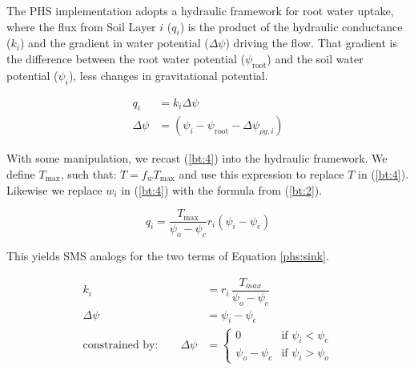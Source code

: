 \documentclass[draft,linenumbers]{agujournal}
\begin{document}
    The PHS implementation adopts a hydraulic framework for root water uptake, where the flux from Soil Layer $i$ ($q_i$) is 
    the product of the hydraulic conductance ($k_i$) and the gradient in water potential ($\Delta\psi$) driving the flow.
    That gradient is the difference between the root water potential ($\psi_{\text{root}}$) and the soil water potential ($\psi_i$), less changes in gravitational potential.
    \begin{linenomath*}
    \begin{equation}
        \begin{aligned}
    q_i &= k_i \Delta\psi \\
    \Delta\psi &= \left(\psi_{i}-\psi_{\text{root}}-\Delta\psi_{\rho g,i} \right)
    \label{phs:sink}
    \end{aligned}
    \end{equation}
    \end{linenomath*}
    
    With some manipulation, we recast (\ref{bt:4}) into the hydraulic framework. We define $T_{\text{max}}$, such that: $T = 
    f_w T_{\text{max}}$ and use this expression to replace $T$ in (\ref{bt:4}).  Likewise we replace $w_i$ in (\ref{bt:4}) with the 
    formula from (\ref{bt:2}).
    
    \begin{linenomath*}
    \begin{equation} 
    q_i = \dfrac{T_{\text{max}}}{\psi_{o}-\psi_{c}} r_i \left(\psi_i-\psi_{c} \right)
    \end{equation}
    \end{linenomath*}
    
    This yields SMS analogs for the two terms of Equation \ref{phs:sink}.
    \begin{linenomath*}
    \begin{equation} \begin{aligned}
    k_i &= r_i \, \dfrac{T_{max}}{\psi_{o}-\psi_{c}} \\
    \Delta\psi &= \psi_i - \psi_{c} \\
    \mbox{constrained by:} \qquad
    \Delta\psi &=
    \begin{cases}
    0                          & \text{if } \psi_i<\psi_{c}  \\
    \psi_{o}-\psi_{c} & \text{if } \psi_i>\psi_{o}
    \label{kb}
    \end{cases}
    \end{aligned}\end{equation}
    \end{linenomath*}
\end{document}
